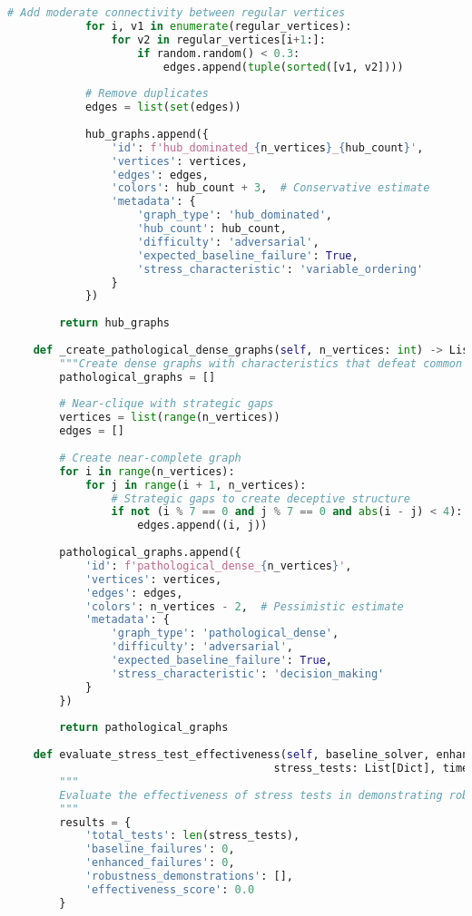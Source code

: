 \begin{lstlisting}[language=Python, caption=Adversarial Test Generation for Robustness Boundary Analysis]
            # Add moderate connectivity between regular vertices
            for i, v1 in enumerate(regular_vertices):
                for v2 in regular_vertices[i+1:]:
                    if random.random() < 0.3:
                        edges.append(tuple(sorted([v1, v2])))
            
            # Remove duplicates
            edges = list(set(edges))
            
            hub_graphs.append({
                'id': f'hub_dominated_{n_vertices}_{hub_count}',
                'vertices': vertices,
                'edges': edges,
                'colors': hub_count + 3,  # Conservative estimate
                'metadata': {
                    'graph_type': 'hub_dominated',
                    'hub_count': hub_count,
                    'difficulty': 'adversarial',
                    'expected_baseline_failure': True,
                    'stress_characteristic': 'variable_ordering'
                }
            })
        
        return hub_graphs
    
    def _create_pathological_dense_graphs(self, n_vertices: int) -> List[Dict]:
        """Create dense graphs with characteristics that defeat common heuristics."""
        pathological_graphs = []
        
        # Near-clique with strategic gaps
        vertices = list(range(n_vertices))
        edges = []
        
        # Create near-complete graph
        for i in range(n_vertices):
            for j in range(i + 1, n_vertices):
                # Strategic gaps to create deceptive structure
                if not (i % 7 == 0 and j % 7 == 0 and abs(i - j) < 4):
                    edges.append((i, j))
        
        pathological_graphs.append({
            'id': f'pathological_dense_{n_vertices}',
            'vertices': vertices,
            'edges': edges,
            'colors': n_vertices - 2,  # Pessimistic estimate
            'metadata': {
                'graph_type': 'pathological_dense',
                'difficulty': 'adversarial',
                'expected_baseline_failure': True,
                'stress_characteristic': 'decision_making'
            }
        })
        
        return pathological_graphs
    
    def evaluate_stress_test_effectiveness(self, baseline_solver, enhanced_solver, 
                                         stress_tests: List[Dict], timeout: float = 15.0) -> Dict:
        """
        Evaluate the effectiveness of stress tests in demonstrating robustness improvements.
        """
        results = {
            'total_tests': len(stress_tests),
            'baseline_failures': 0,
            'enhanced_failures': 0,
            'robustness_demonstrations': [],
            'effectiveness_score': 0.0
        }
        

\end{lstlisting}
